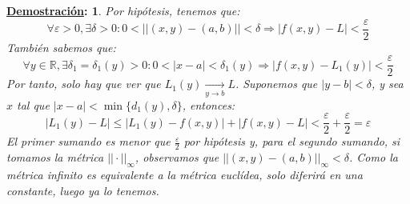 \documentclass[10pt,a4paper,openright]{book}
\theoremstyle{break}
\newtheorem*{demo}{\underline{Demostración}:}
\begin{document}
\begin{demo}
Por hipótesis, tenemos que:
$$\forall \varepsilon > 0, \exists \delta > 0 : 0 < || (x,y) - (a,b) || < \delta \Rightarrow |f(x,y) - L | < \frac{\varepsilon}{2}$$
También sabemos que:
$$\forall y \in \mathbb{R}, \exists \delta_1 = \delta_1 (y) > 0 : 0 < |x-a| < \delta_1 (y) \Rightarrow |f(x,y) - L_1 (y)| < \frac{\varepsilon}{2}$$
Por tanto, solo hay que ver que $L_1 (y) \xrightarrow[y\rightarrow b]{} L$. Suponemos que $|y-b| < \delta$, y sea $x$ tal que $|x - a| < \min\{d_1 (y), \delta\}$, entonces:
$$|L_1 (y) - L | \leq |L_1 (y) - f(x,y)| + |f(x,y) - L| < \frac{\varepsilon}{2}  + \frac{\varepsilon}{2} = \varepsilon$$
El primer sumando es menor que $\frac{\varepsilon}{2}$ por hipótesis y, para el segundo sumando, si tomamos la métrica $||\cdot||_\infty$, observamos que $||(x,y) - (a,b)||_\infty < \delta$. Como la métrica infinito es equivalente a la métrica euclídea, solo diferirá en una constante, luego ya lo tenemos.
\end{demo}
\newpage
\end{document}
